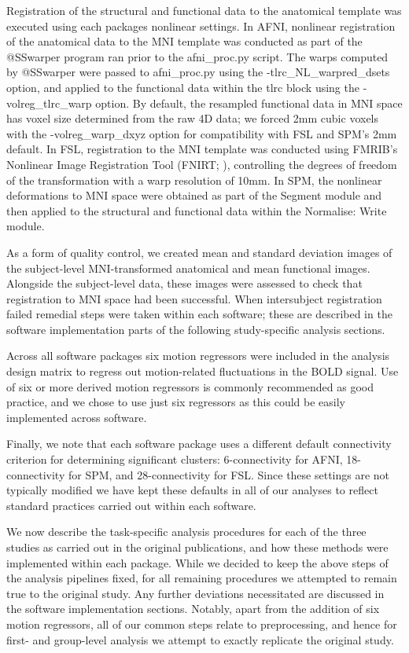 Registration of the structural and functional data to the anatomical template was executed using each packages nonlinear settings. In AFNI, nonlinear registration of the anatomical data to the MNI template was conducted as part of the @SSwarper program ran prior to the afni\_proc.py script. The warps computed by @SSwarper were passed to afni\_proc.py using the -tlrc\_NL\_warpred\_dsets option, and applied to the functional data within the tlrc block using the -volreg\_tlrc\_warp option. By default, the resampled functional data in MNI space has voxel size determined from the raw 4D data; we forced 2mm cubic voxels with the -volreg\_warp\_dxyz option for compatibility with FSL and SPM's 2mm default. In FSL, registration to the MNI template was conducted using FMRIB's Nonlinear Image Registration Tool (FNIRT; \citep{Andersson2007-lc}), controlling the degrees of freedom of the transformation with a warp resolution of 10mm. In SPM, the nonlinear deformations to MNI space were obtained as part of the Segment module and then applied to the structural and functional data within the Normalise: Write module. 

As a form of quality control, we created mean and standard deviation images of the subject-level MNI-transformed anatomical and mean functional images. Alongside the subject-level data, these images were assessed to check that registration to MNI space had been successful. When intersubject registration failed remedial steps were taken within each software; these are described in the software implementation parts of the following study-specific analysis sections. 

Across all software packages six motion regressors were included in the analysis design matrix to regress out motion-related fluctuations in the BOLD signal. Use of six or more derived motion regressors is commonly recommended as good practice, and we chose to use just six regressors as this could be easily implemented across software. 

Finally, we note that each software package uses a different default connectivity criterion for determining significant clusters: 6-connectivity for AFNI, 18-connectivity for SPM, and 28-connectivity for FSL. Since these settings are not typically modified we have kept these defaults in all of our analyses to reflect standard practices carried out within each software. 

We now describe the task-specific analysis procedures for each of the three studies as carried out in the original publications, and how these methods were implemented within each package. While we decided to keep the above steps of the analysis pipelines fixed, for all remaining procedures we attempted to remain true to the original study. Any further deviations necessitated are discussed in the software implementation sections. Notably, apart from the addition of six motion regressors, all of our common steps relate to preprocessing, and hence for first- and group-level analysis we attempt to exactly replicate the original study. 


